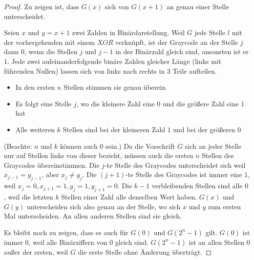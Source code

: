 \documentclass[a4paper,10pt]{article}
\begin{document}
\begin{proof}
 Zu zeigen ist, dass $G(x)$ sich von $G(x + 1)$ an genau einer Stelle unterscheidet.
 
 Seien $x$ und $y = x + 1$ zwei Zahlen in Binärdarstellung.
 Weil $G$ jede Stelle $l$ mit der vorhergehenden mit einem $XOR$ verknüpft, ist der Graycode an der Stelle $j$ dann $0$, wenn die Stellen $j$ und $j - 1$ in der Binärzahl gleich sind, ansonsten ist er $1$.
 Jede zwei aufeinanderfolgende binäre Zahlen gleicher Länge (links mit führenden Nullen) lassen sich von links nach rechts in 3 Teile aufteilen.
 \begin{itemize}
  \item In den ersten $n$ Stellen stimmen sie genau überein
  \item Es folgt eine Stelle $j$, wo die kleinere Zahl eine $0$ und die größere Zahl eine $1$ hat
  \item Alle weiteren $k$ Stellen sind bei der kleineren Zahl $1$ und bei der größeren $0$
 \end{itemize}
 (Beachte: $n$ und $k$ können auch $0$ sein.)
 Da die Vorschrift $G$ sich an jeder Stelle nur auf Stellen links von dieser bezieht, müssen auch die ersten $n$ Stellen des Graycodes übereinstimmen.
 Die $j$-te Stelle des Graycodes unterscheidet sich weil $x_{j - 1} = y_{j - 1}$, aber $x_j \ne y_j$.
 Die $(j + 1)$-te Stelle des Graycodes ist immer eine $1$, weil $x_j = 0, x_{j + 1} = 1, y_j = 1, y_{j + 1} = 0$.
 Die $k - 1$ verbleibenden Stellen sind alle $0$, weil die letzten $k$ Stellen einer Zahl alle denselben Wert haben.
 $G(x)$ und $G(y)$ unterscheiden sich also genau an der Stelle, wo sich $x$ und $y$ zum ersten Mal unterscheiden.
 An allen anderen Stellen sind sie gleich.
 
 Es bleibt noch zu zeigen, dass es auch für $G(0)$ und $G(2^n - 1)$ gilt.
 $G(0)$ ist immer $0$, weil alle Binärziffern von $0$ gleich sind.
 $G(2^n - 1)$ ist an allen Stellen $0$ außer der ersten, weil $G$ die erste Stelle ohne Änderung überträgt.
\end{proof}
\end{document}
